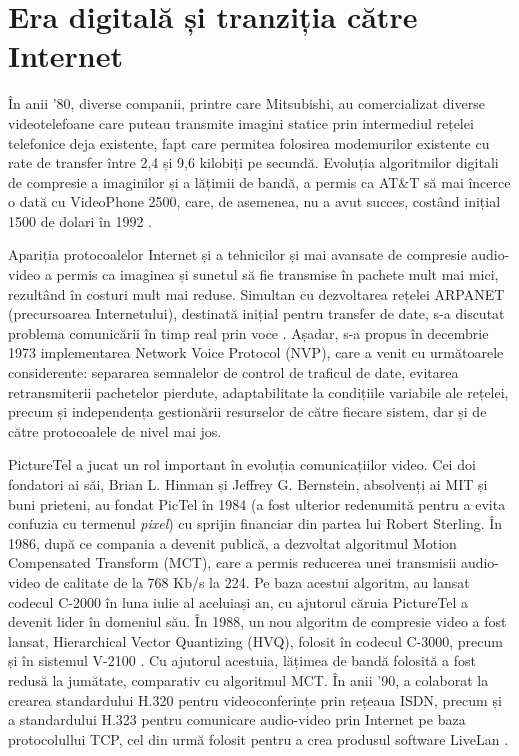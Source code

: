 \section{Era digitală și tranziția către Internet}
\label{sec:ch2sec2}

\indent \par În anii '80, diverse companii, printre care Mitsubishi, au comercializat diverse videotelefoane care puteau transmite imagini statice prin intermediul rețelei telefonice deja existente, fapt care permitea folosirea modemurilor existente cu rate de transfer între 2,4 și 9,6 kilobiți pe secundă. Evoluția algoritmilor digitali de compresie a imaginilor și a lățimii de bandă, a permis ca AT\&T să mai încerce o dată cu VideoPhone 2500, care, de asemenea, nu a avut succes, costând inițial 1500 de dolari în 1992 \cite{Borth98}.
\indent \par Apariția protocoalelor Internet și a tehnicilor și mai avansate de compresie audio-video a permis ca imaginea și sunetul să fie transmise în pachete mult mai mici, rezultând în costuri mult mai reduse. Simultan cu dezvoltarea rețelei ARPANET (precursoarea Internetului), destinată inițial pentru transfer de date, s-a discutat problema comunicării în timp real prin voce \cite{RFC741}. Așadar, s-a propus în decembrie 1973 implementarea Network Voice Protocol (NVP), care a venit cu următoarele considerente: separarea semnalelor de control de traficul de date, evitarea retransmiterii pachetelor pierdute, adaptabilitate la condițiile variabile ale rețelei, precum și independența gestionării resurselor de către fiecare sistem, dar și de către protocoalele de nivel mai jos\cite{RFC741}.
\indent \par PictureTel a jucat un rol important în evoluția comunicațiilor video. Cei doi fondatori ai săi, Brian L. Hinman și Jeffrey G. Bernstein, absolvenți ai MIT și buni prieteni, au fondat PicTel în 1984 (a fost ulterior redenumită pentru a evita confuzia cu termenul \textit{pixel}) cu sprijin financiar din partea lui Robert Sterling. În 1986, după ce compania a devenit publică, a dezvoltat algoritmul Motion Compensated Transform (MCT), care a permis reducerea unei transmisii audio-video de calitate de la 768 Kb/s la 224. Pe baza acestui algoritm, au lansat codecul C-2000 în luna iulie al aceluiași an, cu ajutorul căruia PictureTel a devenit lider în domeniul său. În 1988, un nou algoritm de compresie video a fost lansat, Hierarchical Vector Quantizing (HVQ), folosit în codecul C-3000, precum și în sistemul V-2100 \cite{Root2000}. Cu ajutorul acestuia, lățimea de bandă folosită a fost redusă la jumătate, comparativ cu algoritmul MCT. În anii '90, a colaborat la crearea standardului H.320 pentru videoconferințe prin rețeaua ISDN, precum și a standardului H.323 pentru comunicare audio-video prin Internet pe baza protocolullui TCP, cel din urmă folosit pentru a crea produsul software LiveLan \cite{Root2000}.

